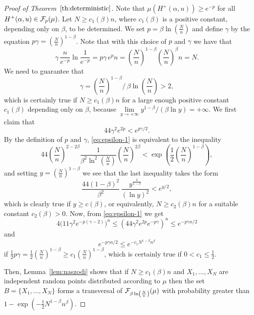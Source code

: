 \documentclass[11pt,leqno]{article}
\theoremstyle{definition}
\theoremstyle{remark}
\numberwithin{equation}{section}
\newcommand{\ls}{\leqslant}
\newcommand{\gr}{\geqslant}
\newcommand{\1}{\textbf{1}}
\begin{document}
\begin{proof}[Proof of Theorem~$\ref{th:deterministic}$]
Note that $\mu(H^+(\alpha,u))\gr e^{-p}$ for all $H^+(\alpha,u)\in {\cal F}_p(\mu)$. Let $N\gr c_1(\beta)n$, where
$c_1(\beta)$ is a positive constant, depending only on $\beta$, to be determined.
We set $p=\beta\ln\left(\frac{N}{n}\right)$ and define $\gamma$ by the equation
$p\gamma =\left(\frac{N}{n}\right)^{1-\beta}$. Note that with this choice of $p$ and $\gamma$ we have that
$$\gamma\,\frac{n}{e^{-p}}\ln \frac{1}{e^{-p}}=p\gamma \,e^pn=\left(\frac{N}{n}\right)^{1-\beta}\left(\frac{N}{n}\right)^{\beta}n=N.$$
We need to guarantee that
$$\gamma=\left(\frac{N}{n}\right)^{1-\beta}\big/\,\beta\ln\left(\frac{N}{n}\right)>2,$$
which is certainly true if $N\gr c_1(\beta)n$ for a large enough positive constant $c_1(\beta)$ depending only
on $\beta$, because $\lim\limits_{y\to +\infty}y^{1-\beta}/(\beta\ln y)=+\infty $.
We first claim that
\begin{equation}\label{eq:epsilon-1}44\gamma^2e^{2p}<e^{p\gamma/2}.\end{equation}
By the definition of $p$ and $\gamma$, \eqref{eq:epsilon-1} is equivalent to the inequality
$$44\left(\frac{N}{n}\right)^{2-2\beta}\frac{1}{\beta^2\ln^2\left(\frac{N}{n}\right)}\left(\frac{N}{n}\right)^{2\beta}<
\exp\left(\frac{1}{2}\left(\frac{N}{n}\right)^{1-\beta}\right),$$
and setting $y=\left(\frac{N}{n}\right)^{1-\beta}$ we see that the last inequality takes the form
\begin{equation}\label{eq:epsilon-2}\frac{44(1-\beta)^2}{\beta^2}\,
\frac{y^{\frac{2}{1-\beta}}}{(\ln y)^2}<e^{y/2},\end{equation}
which is clearly true if $y\gr c(\beta)$, or equivalently, $N\gr c_2(\beta)n$ for a suitable constant
$c_2(\beta)>0$. Now, from \eqref{eq:epsilon-1} we get
$$4\big(11\gamma^2e^{-p(\gamma -2)}\big)^{n} \ls (44\gamma^2e^{2p}e^{-p\gamma})^{n}
\ls e^{-p\gamma n/2}$$
and
\begin{equation}\label{eq:epsilon-3}e^{-p\gamma n/2}\ls e^{-c_1N^{1-\beta} n^{\beta}}\end{equation}
if $\frac{1}{2} p\gamma=\frac{1}{2}\left(\frac{N}{n}\right)^{1-\beta}\gr c_1\left(\frac{N}{n}\right)^{1-\beta}$,
which is certainly true if $0<c_1\ls\frac{1}{2}$.

Then, Lemma~\ref{lem:naszodi} shows that if $N\gr c_1(\beta)n$ and $X_1,\ldots ,X_N$ are independent random points
distributed according to $\mu $ then the set $B=\{X_1,\ldots ,X_N\}$ forms a transversal of ${\cal F}_{\beta\ln\left(\frac{N}{n}\right)}(\mu)$
with probability greater than $1-\exp(-\tfrac{1}{2}N^{1-\beta}n^{\beta})$.


\end{proof}
\end{document}
